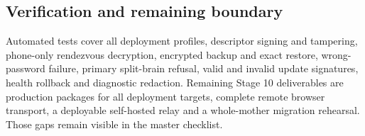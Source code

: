 \subsection{Verification and remaining boundary}

Automated tests cover all deployment profiles, descriptor signing and tampering,
phone-only rendezvous decryption, encrypted backup and exact restore, wrong-password
failure, primary split-brain refusal, valid and invalid update signatures, health
rollback and diagnostic redaction.  Remaining Stage 10 deliverables are production
packages for all deployment targets, complete remote browser transport, a deployable
self-hosted relay and a whole-mother migration rehearsal.  Those gaps remain visible
in the master checklist.
